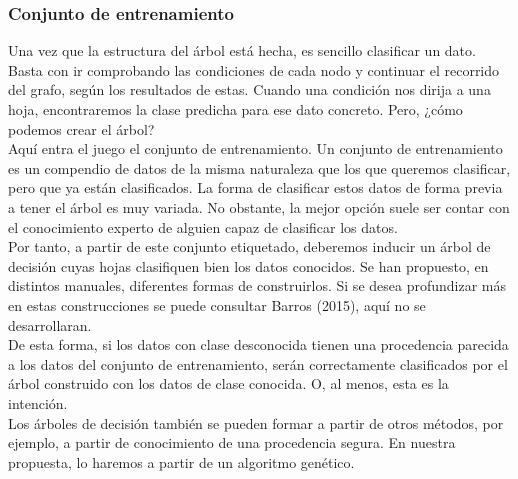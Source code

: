 			\subsubsection{Conjunto de entrenamiento}
			Una vez que la estructura del \'arbol est\'a hecha, es sencillo clasificar un dato. Basta con ir comprobando las condiciones de cada nodo y continuar el recorrido del grafo, seg\'un los resultados de estas. Cuando una condici\'on nos dirija a una hoja, encontraremos la clase predicha para ese dato concreto. Pero, ¿c\'omo podemos crear el \'arbol?\\
			
			Aqu\'i entra el juego el conjunto de entrenamiento. Un conjunto de entrenamiento es un compendio de datos de la misma naturaleza que los que queremos clasificar, pero que ya est\'an clasificados. La forma de clasificar estos datos de forma previa a tener el \'arbol es muy variada. No obstante, la mejor opci\'on suele ser contar con el conocimiento experto de alguien capaz de clasificar los datos.\\
			
			Por tanto, a partir de este conjunto etiquetado, deberemos inducir un \'arbol de decisi\'on cuyas hojas clasifiquen bien los datos conocidos. Se han propuesto, en distintos manuales, diferentes formas de construirlos. Si se desea profundizar m\'as en estas construcciones se puede consultar Barros (2015), aqu\'i no se desarrollaran.\\
			
			De esta forma, si los datos con clase desconocida tienen una procedencia parecida a los datos del conjunto de entrenamiento, ser\'an correctamente clasificados por el \'arbol construido con los datos de clase conocida. O, al menos, esta es la intenci\'on.\\
			
			Los \'arboles de decisi\'on tambi\'en se pueden formar a partir de otros m\'etodos, por ejemplo, a partir de conocimiento de una procedencia segura. En nuestra propuesta, lo haremos a partir de un algoritmo gen\'etico.\\
	